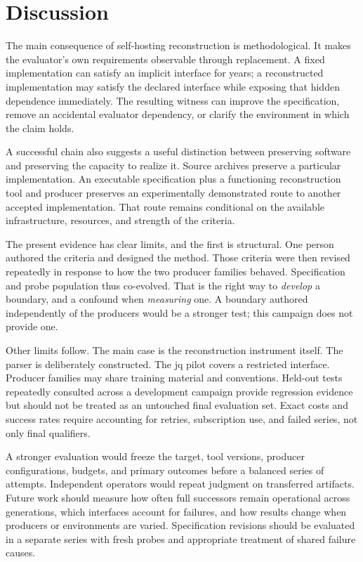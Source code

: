 \documentclass[10pt,twocolumn,letterpaper]{article}
\begin{document}
\section{Discussion}
The main consequence of self-hosting reconstruction is methodological. It makes the evaluator's own requirements observable through replacement. A fixed implementation can satisfy an implicit interface for years; a reconstructed implementation may satisfy the declared interface while exposing that hidden dependence immediately. The resulting witness can improve the specification, remove an accidental evaluator dependency, or clarify the environment in which the claim holds.

A successful chain also suggests a useful distinction between preserving software and preserving the capacity to realize it. Source archives preserve a particular implementation. An executable specification plus a functioning reconstruction tool and producer preserves an experimentally demonstrated route to another accepted implementation. That route remains conditional on the available infrastructure, resources, and strength of the criteria.

The present evidence has clear limits, and the first is structural. One person authored the criteria and designed the method. Those criteria were then revised repeatedly in response to how the two producer families behaved. Specification and probe population thus co-evolved. That is the right way to \emph{develop} a boundary, and a confound when \emph{measuring} one. A boundary authored independently of the producers would be a stronger test; this campaign does not provide one.

Other limits follow. The main case is the reconstruction instrument itself. The parser is deliberately constructed. The jq pilot covers a restricted interface. Producer families may share training material and conventions. Held-out tests repeatedly consulted across a development campaign provide regression evidence but should not be treated as an untouched final evaluation set. Exact costs and success rates require accounting for retries, subscription use, and failed series, not only final qualifiers.

A stronger evaluation would freeze the target, tool versions, producer configurations, budgets, and primary outcomes before a balanced series of attempts. Independent operators would repeat judgment on transferred artifacts. Future work should measure how often full successors remain operational across generations, which interfaces account for failures, and how results change when producers or environments are varied. Specification revisions should be evaluated in a separate series with fresh probes and appropriate treatment of shared failure causes.
\end{document}
